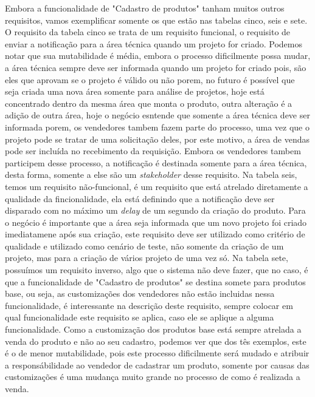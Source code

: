     Embora a funcionalidade de "Cadastro de produtos" tanham muitos outros requisitos,
    vamos exemplificar somente os que estão nas tabelas cinco, seis e sete.
    O requisito da tabela cinco se trata de um requisito funcional, o requisito de
    enviar a notificação para a área técnica quando um projeto for criado. Podemos
    notar que sua mutabilidade é média, embora o processo dificilmente possa mudar,
    a área técnica sempre deve ser informada quando um projeto for criado pois,
    são eles que aprovam se o projeto é válido ou não porem, no futuro é possível
    que seja criada uma nova área somente para análise de projetos, hoje está
    concentrado dentro da mesma área que monta o produto, outra alteração é a
    adição de outra área, hoje o negócio esntende que somente a área técnica deve
    ser informada porem, os vendedores tambem fazem parte do processo, uma vez que
    o projeto pode se tratar de uma solicitação deles, por este motivo, a área de
    vendas pode ser incluída no recebimento da requisição. Embora os vendedores
    tambem participem desse processo, a notificação é destinada somente para a área
    técnica, desta forma, somente a else são um \textit{stakeholder} desse
    requisito. Na tabela seis, temos um requisito não-funcional, é um requisito
    que está atrelado diretamente a qualidade da fincionalidade, ela está definindo
    que a notificação deve ser disparado com no máximo um \textit{delay} de um
    segundo da criação do produto. Para o negócio é importante que a área seja
    informada que um novo projeto foi criado imediatamene após sua criação, este
    requisito deve ser utilizado como critério de qualidade e utilizado como cenário
    de teste, não somente da criação de um projeto, mas para a criação de vários
    projeto de uma vez só. Na tabela sete, possuímos um requisito inverso, algo
    que o sistema não deve fazer, que no caso, é que a funcionalidade de "Cadastro
    de produtos" se destina somete para produtos base, ou seja, as customizações
    dos vendedores não estão incluidas nessa funcionalidade, é interessante na
    descrição deste requisito, sempre colocar em qual funcionalidade este requisito
    se aplica, caso ele se aplique a alguma funcionalidade. Como a customização
    dos produtos base está sempre atrelada a venda do produto e não ao seu
    cadastro, podemos ver que dos tês exemplos, este é o de menor mutabilidade,
    pois este processo dificilmente será mudado e atribuir a responsábilidade ao
    vendedor de cadastrar um produto, somente por causas das customizações é uma
    mudança muito grande no processo de como é realizada a venda.

